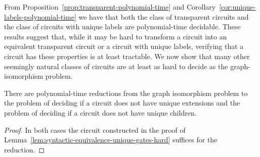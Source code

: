 \documentclass[../paper.tex]{subfiles}
\begin{document}




From Proposition~\ref{prop:transparent-polynomial-time} and
Corollary~\ref{cor:unique-labels-polynomial-time} we have that both the class of
transparent circuits and the class of circuits with unique labels are
polynomial-time decidable. These results suggest that, while it may be hard to
transform a circuit into an equivalent transparent circuit or a circuit with
unique labels, verifying that a circuit has these properties is at least
tractable. We now show that many other seemingly natural classes of circuits are
at least as hard to decide as the graph-isomorphism problem.

\begin{lem}
  There are polynomial-time reductions from the graph isomorphism problem to
  the problem of deciding if a circuit does not have unique extensions and the
  problem of deciding if a circuit does not have unique children.
  \label{lem:unique-extensions-hard}
\end{lem}
\begin{proof}
  In both cases the circuit constructed in the proof of
  Lemma~\ref{lem:syntactic-equivalence-unique-gates-hard} suffices for the
  reduction.
\end{proof}


\end{document}
